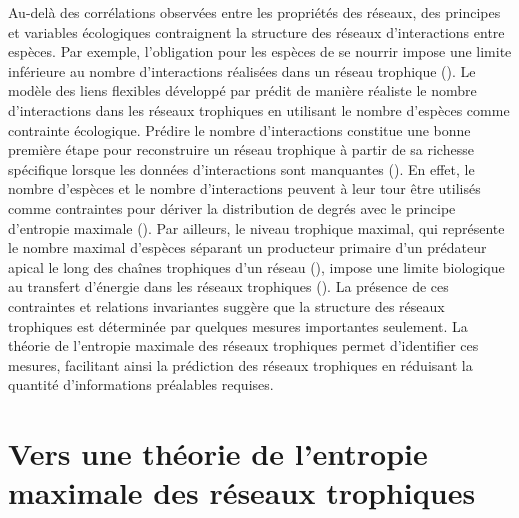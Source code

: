 Au-delà des corrélations observées entre les propriétés des réseaux, des
principes et variables écologiques contraignent la structure des réseaux
d'interactions entre espèces. Par exemple, l'obligation pour les espèces de se
nourrir impose une limite inférieure au nombre d'interactions réalisées dans un
réseau trophique (\cite{MacDonald2020Revisiting}). Le modèle des liens flexibles
développé par \textcite{MacDonald2020Revisiting} prédit de manière réaliste le
nombre d'interactions dans les réseaux trophiques en utilisant le nombre
d'espèces comme contrainte écologique. Prédire le nombre d'interactions
constitue une bonne première étape pour reconstruire un réseau trophique à
partir de sa richesse spécifique lorsque les données d'interactions sont
manquantes (\cite{Strydom2021Roadmapa}). En effet, le nombre d'espèces et le
nombre d'interactions peuvent à leur tour être utilisés comme contraintes pour
dériver la distribution de degrés avec le principe d'entropie maximale
(\cite{Williams2011Biology}). Par ailleurs, le niveau trophique maximal, qui
représente le nombre maximal d'espèces séparant un producteur primaire d'un
prédateur apical le long des chaînes trophiques d'un réseau
(\cite{Cohen1978Food}), impose une limite biologique au transfert d'énergie dans
les réseaux trophiques (\cite{Williams2004Limits}). La présence de ces
contraintes et relations invariantes suggère que la structure des réseaux
trophiques est déterminée par quelques mesures importantes seulement. La théorie
de l'entropie maximale des réseaux trophiques permet d'identifier ces mesures,
facilitant ainsi la prédiction des réseaux trophiques en réduisant la quantité
d'informations préalables requises. 


\section{Vers une théorie de l'entropie maximale des réseaux trophiques}

